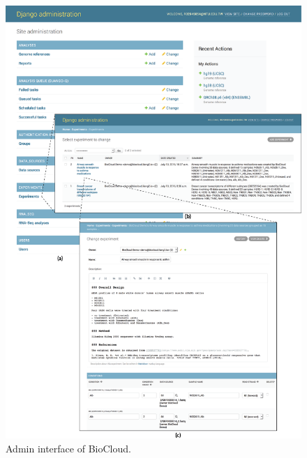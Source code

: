 \begin{figure}[!p]
\centering
\includegraphics[width=1\textwidth]{images/biocloud_admin}
\caption[Admin interface of BioCloud]{
    Admin interface of BioCloud.
}
\label{fig:biocloud-admin}
\end{figure}


